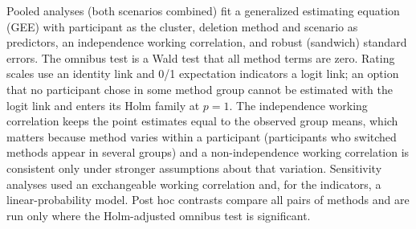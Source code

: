 \documentclass[conference,compsoc]{IEEEtran}
\begin{document}
Pooled analyses (both scenarios combined) fit a generalized estimating
equation (GEE) with participant as the cluster, deletion method and scenario
as predictors, an independence working correlation, and robust (sandwich)
standard errors. The omnibus test is a Wald test that all method terms are
zero. Rating scales use an identity link and 0/1 expectation indicators a
logit link; an option that no participant chose in some method group cannot be
estimated with the logit link and enters its Holm family at $p=1$. The
independence working correlation keeps the point estimates equal to the
observed group means, which matters because method varies within a
participant (participants who switched methods appear in several groups) and
a non-independence working correlation is consistent only under stronger
assumptions about that variation. Sensitivity analyses used an exchangeable
working correlation and, for the indicators, a linear-probability model.
Post hoc contrasts compare all pairs of methods and are run only where the
Holm-adjusted omnibus test is significant.
\end{document}
